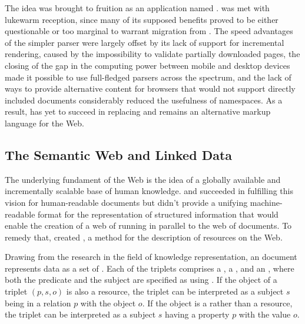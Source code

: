 \documentclass{book}
\begin{document}
The idea was brought to fruition as an  application named
.  was met with lukewarm reception, since many of
its supposed benefits proved to be either questionable or too marginal to
warrant migration from . The speed advantages of the simpler
parser were largely offset by its lack of support for incremental rendering,
caused by the impossibility to validate partially downloaded pages, the closing
of the gap in the computing power between mobile and desktop devices made it
possible to use full-fledged  parsers across the spectrum, and the
lack of ways to provide alternative content for browsers that would not support
directly included  documents considerably reduced the usefulness
of  namespaces. As a result,  has yet to succeed in
replacing  and remains an alternative markup language for the Web.


\subsection{The Semantic Web and Linked Data}
The underlying fundament of the Web is the idea of a globally available and
incrementally scalable base of human knowledge.  and
 succeeded in fulfilling this vision for human-readable documents
but didn't provide a unifying machine-readable format for the representation of
structured information that would enable the creation of a web of 
running in parallel to the web of documents. To remedy that, 
created , a method for the description of resources on the Web.

Drawing from the research in the field of knowledge representation, an
 document represents data as a set of %
. Each of the triplets comprises a
, a %
, and an ,
where both the predicate and the subject are specified as 
 using . If the object of a triplet
$(p,s,o)$ is also a resource, the triplet can be interpreted as a subject $s$
being in a relation $p$ with the object $o$. If the object is a   rather than a resource, the triplet can be
interpreted as a subject $s$ having a property $p$ with the value $o$.
\end{document}
